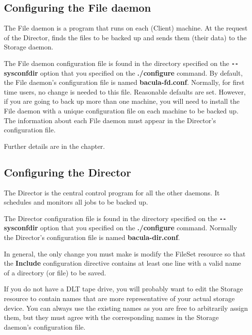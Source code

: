 \subsection{Configuring the File daemon}

The File daemon is a program that runs on each (Client) machine. At the
request of the Director, finds the files to be backed up and sends them (their
data) to the Storage daemon. 

The File daemon configuration file is found in the directory specified on
the {\bf \verb:--:sysconfdir} option that you specified on the {\bf ./configure}
command. By default, the File daemon's configuration file is named {\bf
bacula-fd.conf}. Normally, for first time users, no change is needed to this
file. Reasonable defaults are set. However, if you are going to back up more
than one machine, you will need to install the File daemon with a unique
configuration file on each machine to be backed up. The information about each
File daemon must appear in the Director's configuration file. 

Further details are in the 
 chapter.

\subsection{Configuring the Director}

The Director is the central control program for all the other daemons. It
schedules and monitors all jobs to be backed up. 

The Director configuration file is found in the directory specified on the
{\bf \verb:--:sysconfdir} option that you specified on the {\bf ./configure}
command. Normally the Director's configuration file is named {\bf bacula-dir.conf}. 

In general, the only change you must make is modify the FileSet resource so
that the {\bf Include} configuration directive contains at least one line with
a valid name of a directory (or file) to be saved. 

If you do not have a DLT tape drive, you will probably want to edit the
Storage resource to contain names that are more representative of your actual
storage device. You can always use the existing names as you are free to
arbitrarily assign them, but they must agree with the corresponding names in
the Storage daemon's configuration file. 

